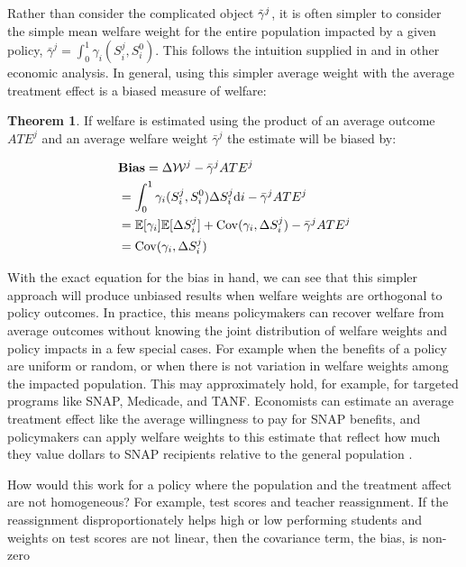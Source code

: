 \documentclass[12pt]{article}
\theoremstyle{definition}
\theoremstyle{definition}
\theoremstyle{definition}
\theoremstyle{definition}
\newtheorem{thm}{Theorem}
\begin{document}
    Rather than consider the complicated object $\Tilde{\gamma}^j$, it is often simpler to consider the simple mean welfare weight for the entire population impacted by a given policy, $\bar{\gamma}^j = \int_0^1 \gamma_i(S_i^j, S_i^0)$. This follows the intuition supplied in \cite{Keyser_2020} and in other economic analysis. In general, using this simpler average weight with the average treatment effect is a biased measure of welfare:
    
  \begin{thm}
    If welfare is estimated using the product of an average outcome $ATE^j$ and an average welfare weight $\bar{\gamma}^j$ the estimate will be biased by: 
    
    \begin{align}
       & \textbf{Bias} = \Delta \mathcal{W}^j - \bar{\gamma}^j ATE^j \\
       & =   \int_0^1 \gamma_i(S_i^j, S_i^0) \Delta S^j_i \text{d}i - \bar{\gamma}^j ATE^j  \\
       & =  \mathbb{E}[\gamma_i] \mathbb{E}[\Delta S^j_i] + \mathrm{Cov}(\gamma_i, \Delta S^j_i) - \bar{\gamma}^j ATE^j  \\
       & = \mathrm{Cov}(\gamma_i, \Delta S^j_i)
    \end{align}
    \end{thm}

    With the exact equation for the bias in hand, we can see that this simpler approach will produce unbiased results when welfare weights are orthogonal to policy outcomes.   In practice, this means policymakers can recover welfare from average outcomes without knowing the joint distribution of welfare weights and policy impacts in a few special cases.  For example when the benefits of a policy are uniform or random, or when there is not variation in welfare weights among the impacted population. This may approximately hold, for example, for targeted programs like SNAP, Medicade, and TANF. Economists can estimate an average treatment effect like the average willingness to pay for SNAP benefits, and policymakers can apply welfare weights to this estimate that reflect how much they value dollars to SNAP recipients relative to the general population \citep{Keyser_2020}. 
    
    How would this work for a policy where the population and the treatment affect are not homogeneous?  For example, test scores and teacher reassignment. If the reassignment disproportionately helps high or low performing students and weights on test scores are not linear, then the covariance term, the bias, is non-zero
\end{document}
